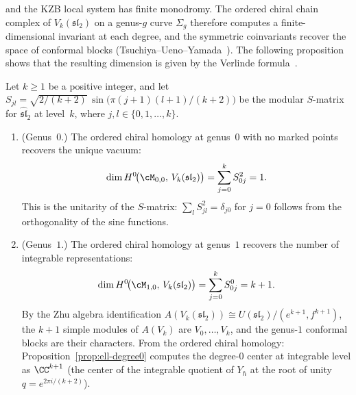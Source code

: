 

and the KZB local system has finite monodromy.
The ordered chiral chain complex of $V_k(\mathfrak{sl}_2)$
on a genus-$g$ curve $\Sigma_g$ therefore computes
a finite-dimensional invariant at each degree, and the
symmetric coinvariants recover the space of conformal
blocks (Tsuchiya--Ueno--Yamada~\cite{TUY89}).
The following proposition shows that the resulting dimension
is given by the Verlinde formula~\cite{Verlinde88}.

\begin{proposition}
\label{prop:verlinde-from-ordered}
Let $k \geq 1$ be a positive integer, and let
$S_{jl} = \sqrt{2/(k+2)}\,\sin\!\bigl(\pi(j+1)(l+1)/(k+2)\bigr)$
be the modular $S$-matrix for $\widehat{\mathfrak{sl}}_2$ at
level~$k$, where $j, l \in \{0, 1, \ldots, k\}$.
\begin{enumerate}[label=\textup{(\roman*)}]
\item \textup{(Genus~$0$.)}
  The ordered chiral homology at genus~$0$ with no marked
  points recovers the unique vacuum:
  \begin{equation}\label{eq:verlinde-g0}
    \dim H^0\!\bigl(\cM_{0,0},\, V_k(\mathfrak{sl}_2)\bigr)
    = \sum_{j=0}^{k} S_{0j}^2 = 1.
  \end{equation}
  This is the unitarity of the $S$-matrix:
  $\sum_l S_{jl}^2 = \delta_{j0}$ for $j = 0$ follows from
  the orthogonality of the sine functions.

\item \textup{(Genus~$1$.)}
  The ordered chiral homology at genus~$1$ recovers the
  number of integrable representations:
  \begin{equation}\label{eq:verlinde-g1}
    \dim H^0\!\bigl(\cM_{1,0},\, V_k(\mathfrak{sl}_2)\bigr)
    = \sum_{j=0}^{k} S_{0j}^0 = k + 1.
  \end{equation}
  By the Zhu algebra identification $A(V_k(\mathfrak{sl}_2))
  \cong U(\mathfrak{sl}_2)/(e^{k+1}, f^{k+1})$, the $k+1$
  simple modules of $A(V_k)$ are $V_0, \ldots, V_k$, and
  the genus-$1$ conformal blocks are their characters.
  From the ordered chiral homology:
  Proposition~\textup{\ref{prop:ell-degree0}} computes
  the degree-$0$ center at integrable level as $\CC^{k+1}$
  \textup{(}the center of the integrable quotient of $Y_\hbar$
  at the root of unity $q = e^{2\pi i/(k+2)}$\textup{)}.


\end{enumerate}
\end{proposition}
